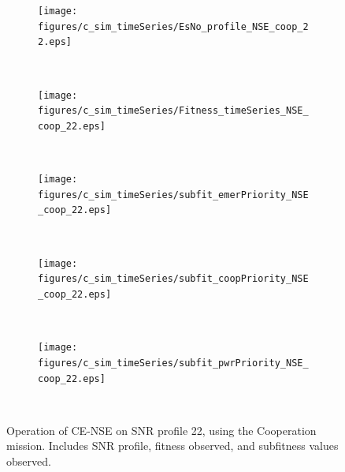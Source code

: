 \begin{figure}[ht!]
\centering
\begin{subfigure}{\linewidth}
	\centering
	\texttt{[image: figures/c\_sim\_timeSeries/EsNo\_profile\_NSE\_coop\_22.eps]}
\end{subfigure}\\
\begin{subfigure}{\linewidth}
	\centering
	\texttt{[image: figures/c\_sim\_timeSeries/Fitness\_timeSeries\_NSE\_coop\_22.eps]}
\end{subfigure}\\
\begin{subfigure}{\linewidth}
	\centering
	\texttt{[image: figures/c\_sim\_timeSeries/subfit\_emerPriority\_NSE\_coop\_22.eps]}
\end{subfigure}\\
\begin{subfigure}{\linewidth}
	\centering
	\texttt{[image: figures/c\_sim\_timeSeries/subfit\_coopPriority\_NSE\_coop\_22.eps]}
	
\end{subfigure}\\
\begin{subfigure}{\linewidth}
	\centering
	\texttt{[image: figures/c\_sim\_timeSeries/subfit\_pwrPriority\_NSE\_coop\_22.eps]}
\end{subfigure}\\
\caption{Operation of CE-NSE on SNR profile 22, using the Cooperation mission. Includes SNR profile, fitness observed, and subfitness values observed.}\label{fig:c22NSECoop}
\end{figure}
\clearpage


